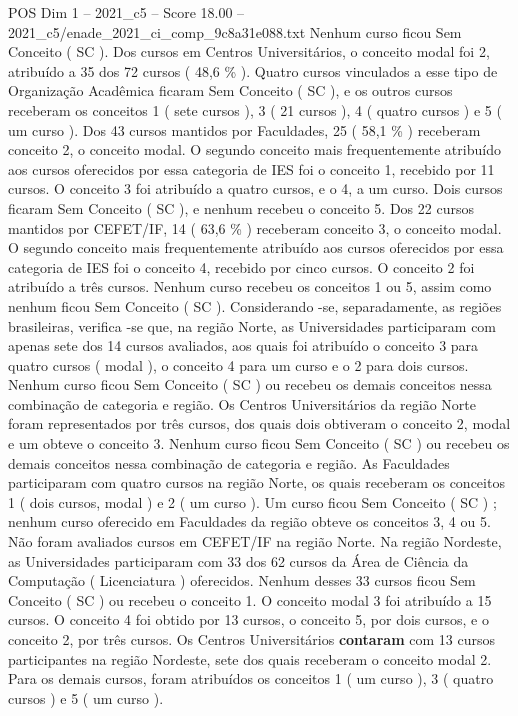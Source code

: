 \begin{textsample}{POS Dim 1 – 2021\_c5 – Score 18.00 – 2021\_c5/enade\_2021\_ci\_comp\_9c8a31e088.txt}
Nenhum curso ficou Sem Conceito ( SC ).
Dos cursos em Centros Universitários, o conceito modal foi 2, atribuído a 35 dos 72 cursos ( 48,6 \% ).
Quatro cursos vinculados a esse tipo de Organização Acadêmica ficaram Sem Conceito ( SC ), e os outros cursos receberam os conceitos 1 ( sete cursos ), 3 ( 21 cursos ), 4 ( quatro cursos ) e 5 ( um curso ).
Dos 43 cursos mantidos por Faculdades, 25 ( 58,1 \% ) receberam conceito 2, o conceito modal.
O segundo conceito mais frequentemente atribuído aos cursos oferecidos por essa categoria de IES foi o conceito 1, recebido por 11 cursos.
O conceito 3 foi atribuído a quatro cursos, e o 4, a um curso.
Dois cursos ficaram Sem Conceito ( SC ), e nenhum recebeu o conceito 5.
Dos 22 cursos mantidos por CEFET/IF, 14 ( 63,6 \% ) receberam conceito 3, o conceito modal.
O segundo conceito mais frequentemente atribuído aos cursos oferecidos por essa categoria de IES foi o conceito 4, recebido por cinco cursos.
O conceito 2 foi atribuído a três cursos.
Nenhum curso recebeu os conceitos 1 ou 5, assim como nenhum ficou Sem Conceito ( SC ).
Considerando -se, separadamente, as regiões brasileiras, verifica -se que, na região Norte, as Universidades participaram com apenas sete dos 14 cursos avaliados, aos quais foi atribuído o conceito 3 para quatro cursos ( modal ), o conceito 4 para um curso e o 2 para dois cursos.
Nenhum curso ficou Sem Conceito ( SC ) ou recebeu os demais conceitos nessa combinação de categoria e região.
Os Centros Universitários da região Norte foram representados por três cursos, dos quais dois obtiveram o conceito 2, modal e um obteve o conceito 3.
Nenhum curso ficou Sem Conceito ( SC ) ou recebeu os demais conceitos nessa combinação de categoria e região.
As Faculdades participaram com quatro cursos na região Norte, os quais receberam os conceitos 1 ( dois cursos, modal ) e 2 ( um curso ).
Um curso ficou Sem Conceito ( SC ) ; nenhum curso oferecido em Faculdades da região obteve os conceitos 3, 4 ou 5.
Não foram avaliados cursos em CEFET/IF na região Norte.
Na região Nordeste, as Universidades participaram com 33 dos 62 cursos da Área de Ciência da Computação ( Licenciatura ) oferecidos.
Nenhum desses 33 cursos ficou Sem Conceito ( SC ) ou recebeu o conceito 1.
O conceito modal 3 foi atribuído a 15 cursos.
O conceito 4 foi obtido por 13 cursos, o conceito 5, por dois cursos, e o conceito 2, por três cursos.
Os Centros Universitários \textbf{contaram} com 13 cursos participantes na região Nordeste, sete dos quais receberam o conceito modal 2.
Para os demais cursos, foram atribuídos os conceitos 1 ( um curso ), 3 ( quatro cursos ) e 5 ( um curso ).

\end{textsample}
